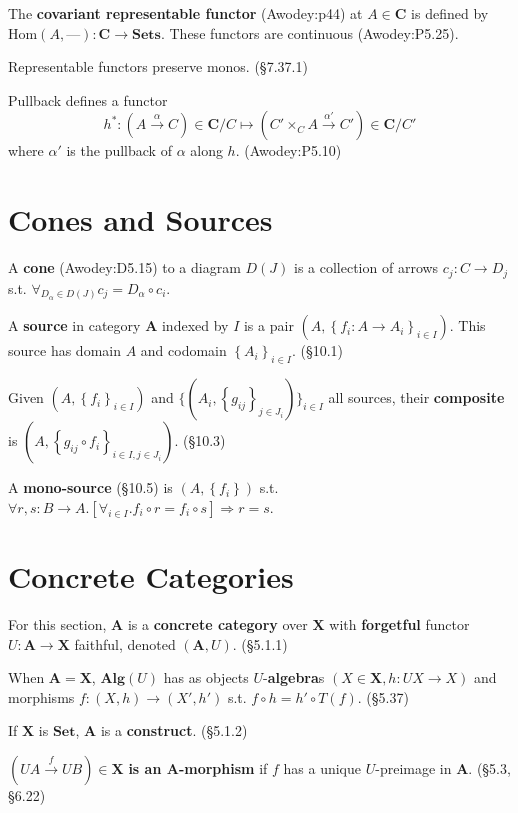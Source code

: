 \documentclass[10pt,twocolumn,letterpaper]{article}
\newcommand{\brak}[1]{\left[{#1}\right]}
\newcommand{\set}[1]{\left\{{#1}\right\}}
\newcommand{\defn}[1]{{\bf #1}}
\begin{document}
  The \defn{covariant representable functor} (Awodey:p44) at $A \in
  \mathbf{C}$ is defined by $\mbox{Hom}(A,\text{---}) : \mathbf{C} \to
  \mathbf{Sets}$.   These functors are continuous (Awodey:P5.25).

  Representable functors preserve monos. (\S7.37.1)

  Pullback defines a functor
    \[ h^* : (A \stackrel{\alpha}{\to} C) \in \mathbf{C}/C
       \mapsto (C' \times_C A \stackrel{\alpha'}{\to} C') \in \mathbf{C}/C' \]
    where $\alpha'$ is the pullback of $\alpha$ along $h$. (Awodey:P5.10)


\section{Cones and Sources}

  A \defn{cone} (Awodey:D5.15) to a diagram $D(J)$ is a collection of arrows
  $c_j : C \to D_j$ s.t. $\forall_{D_\alpha \in D(J)} c_j = D_\alpha \circ
  c_i$.

  A \defn{source} in category $\mathbf{A}$ indexed by $I$ is a pair $(A,
  \set{f_i : A \to A_i}_{i \in I})$.  This source has domain $A$ and
  codomain $\set{A_i}_{i\in I}$. (\S10.1)

  Given $(A,\set{f_i}_{i \in I})$ and
  $\{(A_i,\set{g_{ij}}_{j \in J_i})\}_{i \in I}$
  all sources, their \defn{composite} is $(A, \set{g_{ij} \circ f_i}_{i\in I,
  j\in J_i})$. (\S10.3)

  A \defn{mono-source} (\S10.5) is $(A,\set{f_i})$ s.t. \\ $\forall r,s: B \to A.
  \brak{\forall_{i\in I} . f_i \circ r = f_i \circ s} \Rightarrow r = s$.

\section{Concrete Categories}

  For this section, $\mathbf{A}$ is a \defn{concrete category} over
  $\mathbf{X}$ with \defn{forgetful} functor $U : \mathbf{A} \to \mathbf{X}$
  faithful, denoted $(\mathbf{A}, U)$.  (\S5.1.1)

  When $\mathbf{A} = \mathbf{X}$, $\mathbf{Alg}(U)$ has as objects
  $U$-\defn{algebra}s $(X \in \mathbf{X}, h : UX \to X)$ and morphisms
  $f : (X,h) \to (X',h')$ s.t. $f \circ h = h' \circ T(f)$. (\S5.37)

  If $\mathbf{X}$ is $\mathbf{Set}$, $\mathbf{A}$ is a \defn{construct}.
  (\S5.1.2)

  $(UA \overset{f}{\to} UB) \in \mathbf{X}$ \defn{is an $\mathbf{A}$-morphism}
  if $f$ has a unique $U$-preimage in $\mathbf{A}$. (\S5.3, \S6.22)
\end{document}
